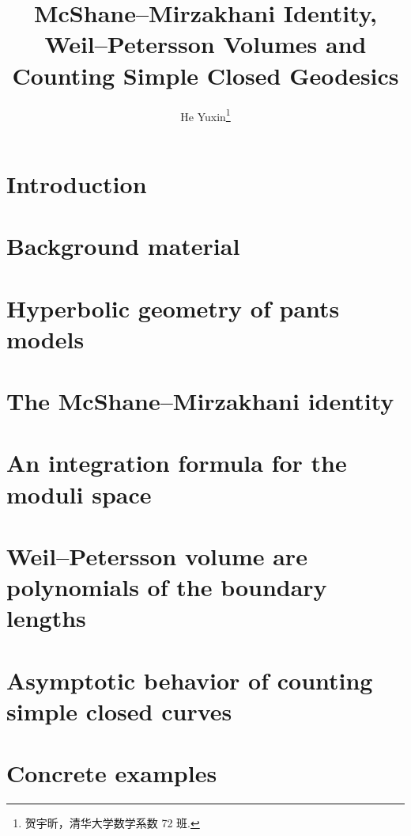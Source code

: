 \documentclass[twoside]{article}
\begin{document}
\title{McShane--Mirzakhani Identity,\\Weil–Petersson Volumes and\\Counting Simple Closed Geodesics}
\author{He Yuxin\footnote{贺宇昕，清华大学数学系数 72 班.}}

\begin{abstract}

\end{abstract}

\section{Introduction} \label{intro}




\section{Background material} \label{backg}




\section{Hyperbolic geometry of pants models} \label{hypergeo}




\section{The McShane--Mirzakhani identity} \label{MMid}




\section{An integration formula for the moduli space} \label{intformula}




\section{Weil--Petersson volume are polynomials of the boundary lengths} \label{wpvolume}



\section{Asymptotic behavior of counting simple closed curves} \label{asym}




\section{Concrete examples} \label{conexamples}



\printbibliography
\end{document}
